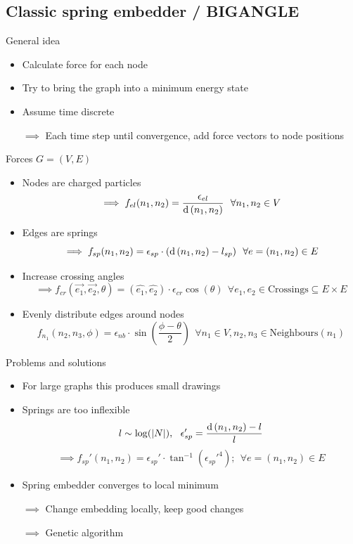 \documentclass[notheorems]{beamer}
\theoremstyle{plain}
\theoremstyle{definition}
\theoremstyle{remark}
\newcommand{\dist}[1]{\ensuremath\text{d}\left(#1\right)}
\begin{document}
\subsection{Classic spring embedder / BIGANGLE}
\begin{frame}{General idea}
\begin{itemize}
\item Calculate force for each node
\item Try to bring the graph into a minimum energy state
\item Assume time discrete 
\item[$\implies$] Each time step until convergence, add force vectors to node positions
\end{itemize}
\end{frame}
\begin{frame}{Forces}
$G = (V, E)$
\begin{itemize}
\item Nodes are charged particles 
$$\implies f_{el}(n_1, n_2) = \frac{\epsilon_{el}}{\dist{n_1, n_2}}~~\forall n_1, n_2\in V$$
\item Edges are springs 
$$\implies f_{sp}(n_1, n_2) = \epsilon_{sp}\cdot(\dist{n_1, n_2} - l_{sp})~~\forall e=(n_1, n_2)\in E$$
\item Increase crossing angles 
$$\implies f_{cr}(\vec{e_1}, \vec{e_2}, \theta) = (\hat{e_1}, \hat{e_2})\cdot\epsilon_{cr}\cos(\theta)~~\forall e_1, e_2\in \text{Crossings}\subseteq E\times E$$
\item Evenly distribute edges around nodes 
$$f_{n_1}(n_2, n_3, \phi)=\epsilon_{nb}\cdot\sin\left(\frac{\phi-\theta}2\right)~~\forall n_1\in V, n_2, n_3\in\text{Neighbours}(n_1)$$
\end{itemize}
\end{frame}
\begin{frame}{Problems and solutions}
\begin{itemize}
\item For large graphs this produces small drawings
\item Springs are too inflexible
$$l \sim \log(|N|), ~~ \epsilon_{sp}' = \frac{\dist{n_1, n_2} - l}l$$
$$\implies f_{sp}'(n_1, n_2) = \epsilon_{sp}'\cdot\tan^{-1}\left({\epsilon_{sp}'}^4\right);~~\forall e=(n_1, n_2)\in E$$
\item Spring embedder converges to local minimum
\item[$\implies$] Change embedding locally, keep good changes
\item[$\implies$] Genetic algorithm
\end{itemize}
\end{frame}
\end{document}
